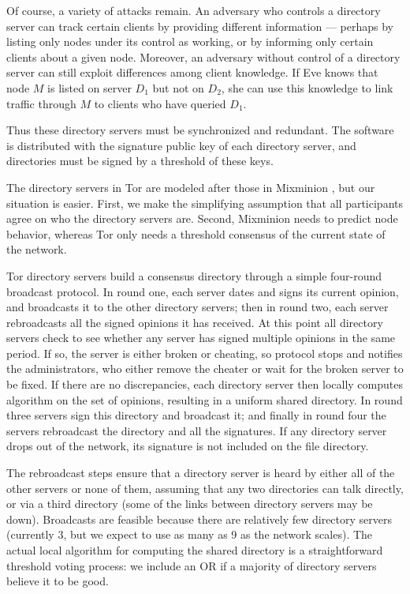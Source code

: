 \documentclass[times,10pt,twocolumn]{article}
\begin{document}
Of course, a variety of attacks remain. An adversary who controls a
directory server can track certain clients by providing different
information --- perhaps by listing only nodes under its control
as working, or by informing only certain clients about a given
node. Moreover, an adversary without control of a directory server can
still exploit differences among client knowledge. If Eve knows that
node $M$ is listed on server $D_1$ but not on $D_2$, she can use this
knowledge to link traffic through $M$ to clients who have queried $D_1$.

Thus these directory servers must be synchronized and redundant. The
software is distributed with the signature public key of each directory
server, and directories must be signed by a threshold of these keys.

The directory servers in Tor are modeled after those in Mixminion
\cite{minion-design}, but our situation is easier. First, we make the
simplifying assumption that all participants agree on who the
directory servers are. Second, Mixminion needs to predict node
behavior, whereas Tor only needs a threshold consensus of the current
state of the network.

Tor directory servers build a consensus directory through a simple
four-round broadcast protocol.  In round one, each server dates and
signs its current opinion, and broadcasts it to the other directory
servers; then in round two, each server rebroadcasts all the signed
opinions it has received.  At this point all directory servers check
to see whether any server has signed multiple opinions in the same
period. If so, the server is either broken or cheating, so protocol
stops and notifies the administrators, who either remove the cheater
or wait for the broken server to be fixed.  If there are no
discrepancies, each directory server then locally computes algorithm
on the set of opinions, resulting in a uniform shared directory. In
round three servers sign this directory and broadcast it; and finally
in round four the servers rebroadcast the directory and all the
signatures.  If any directory server drops out of the network, its
signature is not included on the file directory.

The rebroadcast steps ensure that a directory server is heard by
either all of the other servers or none of them, assuming that any two
directories can talk directly, or via a third directory (some of the
links between directory servers may be down). Broadcasts are feasible
because there are relatively few directory servers (currently 3, but we expect
to use as many as 9 as the network scales). The actual local algorithm
for computing the shared directory is a straightforward threshold
voting process: we include an OR if a majority of directory servers
believe it to be good.
\end{document}
